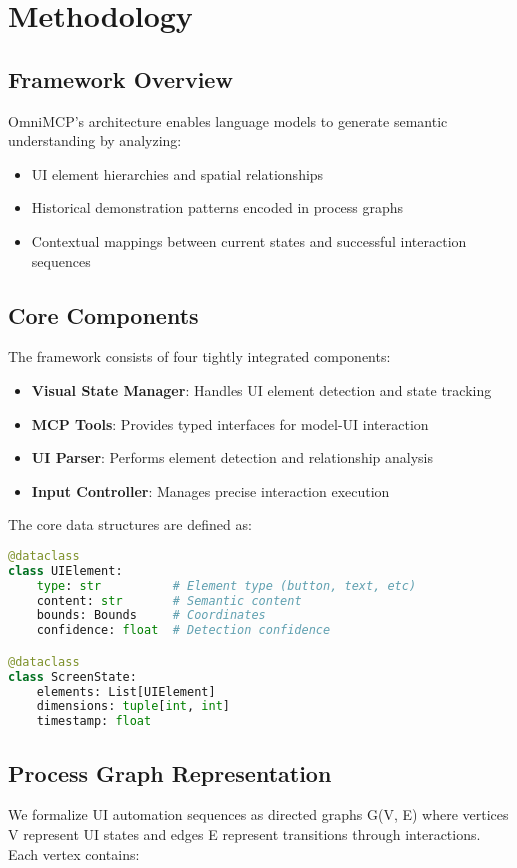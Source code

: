 \documentclass{article}
\begin{document}
\section{Methodology}

\subsection{Framework Overview}
OmniMCP's architecture enables language models to generate semantic understanding by analyzing:
\begin{itemize}
    \item UI element hierarchies and spatial relationships
    \item Historical demonstration patterns encoded in process graphs
    \item Contextual mappings between current states and successful interaction sequences
\end{itemize}

\subsection{Core Components}
The framework consists of four tightly integrated components:

\begin{itemize}
    \item \textbf{Visual State Manager}: Handles UI element detection and state tracking
    \item \textbf{MCP Tools}: Provides typed interfaces for model-UI interaction
    \item \textbf{UI Parser}: Performs element detection and relationship analysis
    \item \textbf{Input Controller}: Manages precise interaction execution
\end{itemize}

The core data structures are defined as:

\begin{lstlisting}[language=Python]
@dataclass
class UIElement:
    type: str          # Element type (button, text, etc)
    content: str       # Semantic content
    bounds: Bounds     # Coordinates  
    confidence: float  # Detection confidence

@dataclass
class ScreenState:
    elements: List[UIElement]
    dimensions: tuple[int, int]
    timestamp: float
\end{lstlisting}

\subsection{Process Graph Representation}
We formalize UI automation sequences as directed graphs G(V, E) where vertices V represent UI states and edges E represent transitions through interactions. Each vertex contains:
\end{document}
